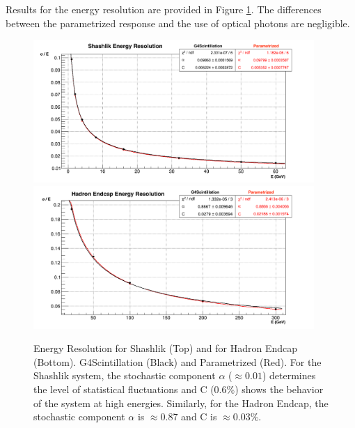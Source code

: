  Results for the energy resolution are provided in Figure \ref{fig:simulations_shashlikhe_resolution}. The differences between the parametrized response and the use of optical photons are negligible.
 \begin{figure}[htbp]
    \centering
    \includegraphics[width=0.95\textwidth]{figures/ch_simulations/shashlik/performance/energyResolution.png}\\
    \includegraphics[width=0.95\textwidth]{figures/ch_simulations/he/performance/Resolution.png}
    \caption{Energy Resolution for Shashlik (Top) and for Hadron Endcap (Bottom). G4Scintillation (Black) and Parametrized (Red). For the Shashlik system, the stochastic component $\alpha$ ($\approx 0.01$) determines the level of statistical fluctuations and C (0.6\%) shows the behavior of the system at high energies. Similarly, for the Hadron Endcap, the stochastic component $\alpha$ is $\approx 0.87$ and C is $\approx0.03\%$.}
    \label{fig:simulations_shashlikhe_resolution}
 \end{figure}